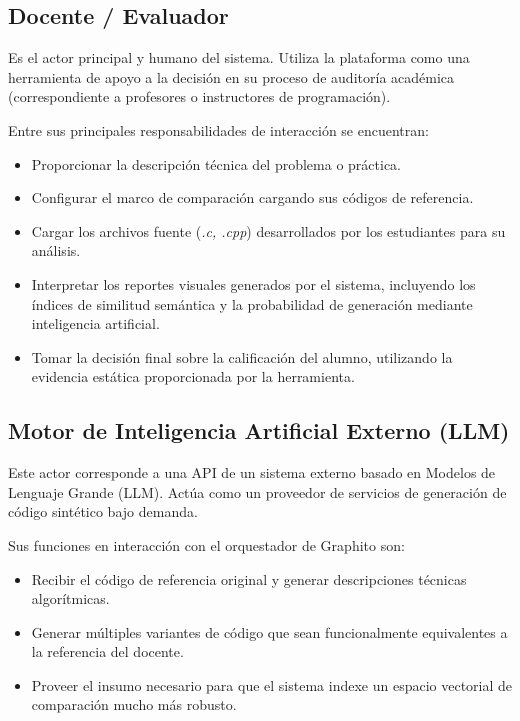 \subsection{Docente / Evaluador}

Es el actor principal y humano del sistema. Utiliza la plataforma como una herramienta de apoyo a la decisión en su proceso de auditoría académica (correspondiente a profesores o instructores de programación).

Entre sus principales responsabilidades de interacción se encuentran:

\begin{itemize}
	\item Proporcionar la descripción técnica del problema o práctica.
	\item Configurar el marco de comparación cargando sus códigos de referencia.
	\item Cargar los archivos fuente (\textit{.c, .cpp}) desarrollados por los estudiantes para su análisis.
	\item Interpretar los reportes visuales generados por el sistema, incluyendo los índices de similitud semántica y la probabilidad de generación mediante inteligencia artificial.
	\item Tomar la decisión final sobre la calificación del alumno, utilizando la evidencia estática proporcionada por la herramienta.
\end{itemize}

\subsection{Motor de Inteligencia Artificial Externo (LLM)}

Este actor corresponde a una API de un sistema externo basado en Modelos de Lenguaje Grande (LLM). Actúa como un proveedor de servicios de generación de código sintético bajo demanda.

Sus funciones en interacción con el orquestador de Graphito son:

\begin{itemize}
	\item Recibir el código de referencia original y generar descripciones técnicas algorítmicas.
	\item Generar múltiples variantes de código que sean funcionalmente equivalentes a la referencia del docente.
	\item Proveer el insumo necesario para que el sistema indexe un espacio vectorial de comparación mucho más robusto.
\end{itemize}

